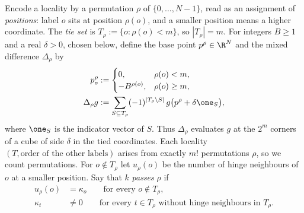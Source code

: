 Encode a locality by a permutation $\rho$ of $\{0,\ldots,N-1\}$, read as an
assignment of \emph{positions}: label $o$ sits at position $\rho(o)$, and a
smaller position means a higher coordinate. The \emph{tie set} is
$T_\rho:=\{o:\rho(o)<m\}$, so $|T_\rho|=m$. For integers $B\geq1$ and a real
$\delta>0$, chosen below, define the base point $p^\rho\in\R^N$ and the mixed
difference $\Delta_\rho$ by
\begin{align}
 p^\rho_o&:=\begin{cases}0,&\rho(o)<m,\\-B^{\rho(o)},&\rho(o)\geq m,\end{cases}\label{eq:base-point}\\
 \Delta_\rho g&:=\sum_{S\subseteq T_\rho}(-1)^{|T_\rho\setminus S|}\,g\bigl(p^\rho+\delta\one_S\bigr),\label{eq:mixed-difference}
\end{align}
where $\one_S$ is the indicator vector of $S$. Thus $\Delta_\rho$ evaluates $g$
at the $2^m$ corners of a cube of side $\delta$ in the tied coordinates. Each
locality $(T,\text{order of the other labels})$ arises from exactly $m!$
permutations $\rho$, so we count permutations. For $o\notin T_\rho$ let
$u_\rho(o)$ be the number of hinge neighbours of $o$ at a smaller position.
Say that $k$ \emph{passes} $\rho$ if
\begin{align}
 u_\rho(o)&=\kappa_o\qquad\text{for every }o\notin T_\rho,\label{eq:balanced}\\
 \kappa_t&\neq0\qquad\text{for every }t\in T_\rho\text{ without hinge neighbours in }T_\rho.\label{eq:active}
\end{align}

